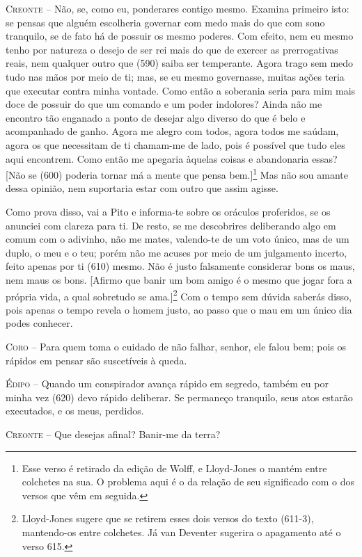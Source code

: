 \textsc{Creonte} --   Não, se, como eu, ponderares contigo mesmo. Examina primeiro isto: se
pensas que alguém escolheria governar com medo mais do que com sono
tranquilo, se de fato há de possuir os mesmo poderes. Com efeito, nem eu
mesmo tenho por natureza o desejo de ser rei mais do que de exercer as
prerrogativas reais, nem qualquer outro que (590) saiba ser temperante.
Agora trago sem medo tudo nas mãos por meio de ti; mas, se eu mesmo
governasse, muitas ações teria que executar contra minha vontade. Como
então a soberania seria para mim mais doce de possuir do que um comando
e um poder indolores? Ainda não me encontro tão enganado a ponto de
desejar algo diverso do que é belo e acompanhado de ganho. Agora me
alegro com todos, agora todos me saúdam, agora os que necessitam de ti
chamam-me de lado, pois é possível que tudo eles aqui encontrem. Como
então me apegaria àquelas coisas e abandonaria essas? {[}Não se (600)
poderia tornar má a mente que pensa bem.{]}\footnote{Esse verso é
  retirado da edição de Wolff, e Lloyd-Jones o mantém entre colchetes na
  sua. O problema aqui é o da relação de seu significado com o dos
  versos que vêm em seguida.} Mas não sou amante dessa opinião, nem
suportaria estar com outro que assim agisse.

Como prova disso, vai a Pito e informa-te sobre os oráculos proferidos,
se os anunciei com clareza para ti. De resto, se me descobrires
deliberando algo em comum com o adivinho, não me mates, valendo-te de um
voto único, mas de um duplo, o meu e o teu; porém não me acuses por meio
de um julgamento incerto, feito apenas por ti (610) mesmo. Não é justo
falsamente considerar bons os maus, nem maus os bons. {[}Afirmo que
banir um bom amigo é o mesmo que jogar fora a própria vida, a qual
sobretudo se ama.{]}\footnote{Lloyd-Jones sugere que se retirem esses
  dois versos do texto (611-3), mantendo-os entre colchetes. Já van
  Deventer sugerira o apagamento até o verso 615.} Com o tempo sem
dúvida saberás disso, pois apenas o tempo revela o homem justo, ao passo
que o mau em um único dia podes conhecer.

\textsc{Coro} --   Para quem toma o cuidado de não falhar, senhor, ele falou bem; pois os
rápidos em pensar são suscetíveis à queda.

\textsc{Édipo} --   Quando um conspirador avança rápido em segredo, também eu por minha vez
(620) devo rápido deliberar. Se permaneço tranquilo, seus atos estarão
executados, e os meus, perdidos.

\textsc{Creonte} --   Que desejas afinal? Banir-me da terra?

